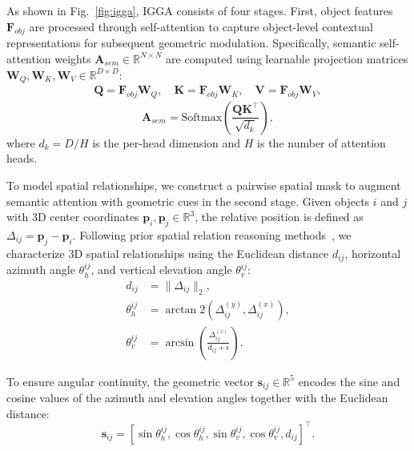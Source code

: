 \documentclass[lettersize,journal]{IEEEtran}
\begin{document}
As shown in Fig.~\ref{fig:igga}, IGGA consists of four stages. First, object features $\mathbf{F}_{obj}$ are processed through self-attention to capture object-level contextual representations for subsequent geometric modulation. Specifically, {semantic} self-attention weights $\mathbf{A}_{sem} \in \mathbb{R}^{N \times N}$ are computed using learnable projection matrices $\mathbf{W}_Q, \mathbf{W}_K, \mathbf{W}_V \in \mathbb{R}^{D \times D}$:
\begin{align}
\mathbf{Q} = \mathbf{F}_{obj}\mathbf{W}_Q, \quad
\mathbf{K} = \mathbf{F}_{obj}\mathbf{W}_K, \quad
\mathbf{V} = \mathbf{F}_{obj}\mathbf{W}_V,
\end{align}
\begin{equation}
\mathbf{A}_{sem} = \text{Softmax}\left(\frac{\mathbf{Q}\mathbf{K}^\top}{\sqrt{d_k}}\right),
\end{equation}
where $d_k = D/H$ is the per-head dimension and $H$ is the number of attention heads.

To model spatial relationships, we construct a pairwise spatial mask to augment semantic attention with geometric cues in the second stage. Given objects $i$ and $j$ with 3D center coordinates $\mathbf{p}_i, \mathbf{p}_j \in \mathbb{R}^3$, the relative position is defined as $\Delta_{ij} = \mathbf{p}_j - \mathbf{p}_i$. Following prior spatial relation reasoning methods~\cite{ViL3DRel2022}, we characterize 3D spatial relationships using the Euclidean distance $d_{ij}$, horizontal azimuth angle $\theta_h^{ij}$, and vertical elevation angle $\theta_v^{ij}$:
\begin{align}
d_{ij} &= \|\Delta_{ij}\|_2, \\
\theta_h^{ij} &= \arctan2(\Delta_{ij}^{(y)}, \Delta_{ij}^{(x)}), \\
\theta_v^{ij} &= \arcsin\left(\frac{\Delta_{ij}^{(z)}}{d_{ij} + \epsilon}\right).
\end{align}

To ensure angular continuity, the geometric vector $\mathbf{s}_{ij}\in \mathbb{R}^5$ encodes the sine and cosine values of the azimuth and elevation angles together with the Euclidean distance:
\begin{equation}
\mathbf{s}_{ij} = [\sin\theta_h^{ij}, \cos\theta_h^{ij}, \sin\theta_v^{ij}, \cos\theta_v^{ij}, d_{ij}]^\top.
\end{equation}
\end{document}
